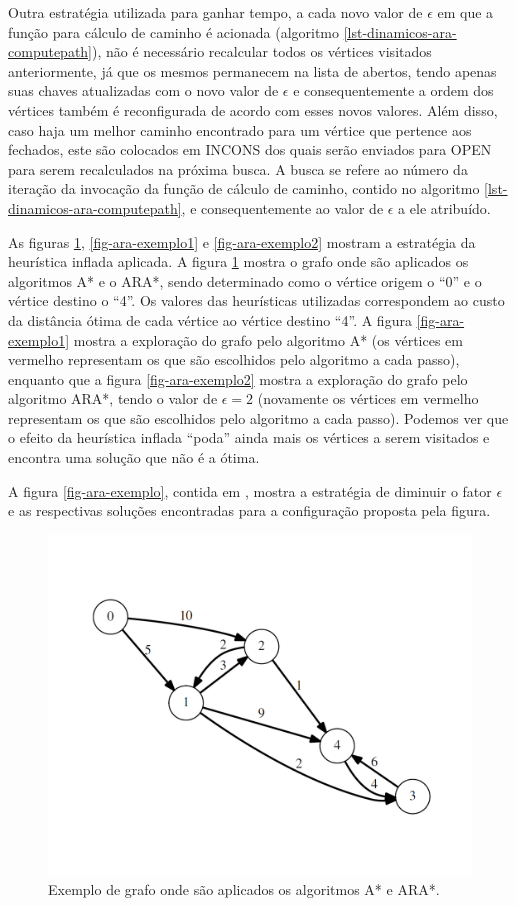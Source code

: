 Outra estratégia utilizada para ganhar tempo, a cada novo valor de $\epsilon$ em que a função para cálculo de caminho é acionada (algoritmo \ref{lst-dinamicos-ara-computepath}), não é necessário recalcular todos os vértices visitados anteriormente, já que os mesmos permanecem na lista de abertos, tendo apenas suas chaves atualizadas com o novo valor de $\epsilon$ e consequentemente a ordem dos vértices também é reconfigurada de acordo com esses novos valores. Além disso, caso haja um melhor caminho encontrado para um vértice que pertence aos fechados, este são colocados em INCONS dos quais serão enviados para OPEN para serem recalculados na próxima busca. A busca se refere ao número da iteração da invocação da função de cálculo de caminho, contido no algoritmo \ref{lst-dinamicos-ara-computepath}, e consequentemente ao valor de $\epsilon$ a ele atribuído.

As figuras \ref{fig-ara-exemplo3}, \ref{fig-ara-exemplo1} e \ref{fig-ara-exemplo2} mostram a estratégia da heurística inflada aplicada. A figura \ref{fig-ara-exemplo3} mostra o grafo onde são aplicados os algoritmos A* e o ARA*, sendo determinado como o vértice origem o ``0'' e o vértice destino o ``4''. Os valores das heurísticas utilizadas correspondem ao custo da distância ótima de cada vértice ao vértice destino ``4''. A figura \ref{fig-ara-exemplo1} mostra a exploração do grafo pelo algoritmo A* (os vértices em vermelho representam os que são escolhidos pelo algoritmo a cada passo), enquanto que a figura \ref{fig-ara-exemplo2} mostra a exploração do grafo pelo algoritmo ARA*, tendo o valor de $\epsilon = 2$ (novamente os vértices em vermelho representam os que são escolhidos pelo algoritmo a cada passo). Podemos ver que o efeito da heurística inflada ``poda'' ainda mais os vértices a serem visitados e encontra uma solução que não é a ótima.

A figura \ref{fig-ara-exemplo}, contida em , mostra a estratégia de diminuir o fator $\epsilon$ e as respectivas soluções encontradas para a configuração proposta pela figura.
\newpage
\begin{figure}[H]
\centering
\includegraphics[width=.70\textwidth]{figuras/ARA-exemplo3} 
\caption{Exemplo de grafo onde são aplicados os algoritmos A* e ARA*.}
\label{fig-ara-exemplo3}
\end{figure}

